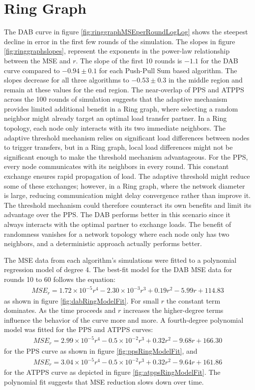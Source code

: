 \section{Ring Graph}\label{sec:ringgraph}
The DAB curve in figure \ref{fig:ringgraphMSEperRoundLogLog} shows the steepest decline in error in the first few rounds of the simulation. The slopes in figure \ref{fig:ringgraphslopes}, represent the exponents in the power-law relationship between the MSE and $r$. The slope of the first 10 rounds is $-1.1$ for the DAB curve compared to $-0.94 \pm 0.1$ for each Push-Pull Sum based algorithm. The slopes decrease for all three algorithms to $-0.53 \pm 0.3$ in the middle region and remain at these values for the end region. The near-overlap of PPS and ATPPS across the 100 rounds of simulation suggests that the adaptive mechanism provides limited additional benefit in a Ring graph, where selecting a random neighbor might already target an optimal load transfer partner. In a Ring topology, each node only interacts with its two immediate neighbors. The adaptive threshold mechanism relies on significant load differences between nodes to trigger transfers, but in a Ring graph, local load differences might not be significant enough to make the threshold mechanism advantageous. For the PPS, every node communicates with its neighbors in every round. This constant exchange ensures rapid propagation of load. The adaptive threshold might reduce some of these exchanges; however, in a Ring graph, where the network diameter is large, reducing communication might delay convergence rather than improve it. The threshold mechanism could therefore counteract its own benefits and limit its advantage over the PPS. The DAB performs better in this scenario since it always interacts with the optimal partner to exchange loads. The benefit of randomness vanishes for a network topology where each node only has two neighbors, and a deterministic approach actually performs better.

The MSE data from each algorithm's simulations were fitted to a polynomial regression model of degree 4. The best-fit model for the DAB MSE data for rounds 10 to 60 follows the equation:
\begin{align}
    MSE_r=1.72\times 10^{-5}r^{4}-2.30\times 10^{-3}r^{3}+ 0.19r^{2}-5.99r+114.83    
\end{align}
as shown in figure \ref{fig:dabRingModelFit}. For small $r$ the constant term dominates. As the time proceeds and $r$ increases the higher-degree terms influence the behavior of the curve more and more. A fourth-degree polynomial model was fitted for the PPS and ATPPS curves:
\begin{align}
    MSE_r= 2.99\times 10^{-5}r^{4}-0.5\times 10^{-2}r^{3} + 0.32r^{2} -9.68r + 166.30    
\end{align}
for the PPS curve as shown in figure \ref{fig:ppsRingModelFit}, and 
\begin{align}
    MSE_r=3.04\times 10^{-5}r^{4}-0.5\times 10^{-2}r^{3} + 0.32r^{2}-9.64r+161.86    
\end{align}
for the ATPPS curve as depicted in figure \ref{fig:atppsRingModelFit}. The polynomial fit suggests that MSE reduction slows down over time.

